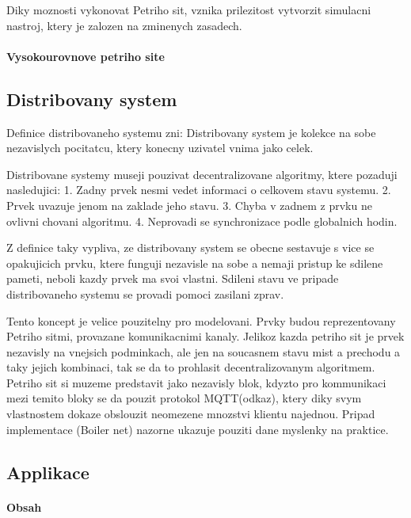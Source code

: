 Diky moznosti vykonovat Petriho sit, vznika prilezitost vytvorzit simulacni nastroj, ktery je zalozen na zminenych zasadech. 

\paragraph*{Vysokourovnove petriho site}
\subsection*{Distribovany system}
Definice distribovaneho systemu zni:
Distribovany system je kolekce na sobe nezavislych pocitatcu, ktery konecny uzivatel vnima jako celek. 

Distribovane systemy museji pouzivat decentralizovane algoritmy, ktere pozaduji nasledujici: 1. Zadny prvek nesmi vedet informaci o celkovem stavu systemu. 2. Prvek uvazuje jenom na zaklade jeho stavu. 3. Chyba v zadnem z prvku ne ovlivni chovani algoritmu. 4. Neprovadi se synchronizace podle globalnich hodin. 

Z definice taky vypliva, ze distribovany system se obecne sestavuje s vice se opakujicich prvku, ktere funguji nezavisle na sobe a nemaji pristup ke sdilene pameti, neboli kazdy prvek ma svoi vlastni. Sdileni stavu ve pripade distribovaneho systemu se provadi pomoci zasilani zprav.

Tento koncept je velice pouzitelny pro modelovani. Prvky budou reprezentovany Petriho sitmi, provazane komunikacnimi kanaly. Jelikoz kazda petriho sit je prvek nezavisly na vnejsich podminkach, ale jen na soucasnem stavu mist a prechodu a taky jejich kombinaci, tak se da to prohlasit decentralizovanym algoritmem. Petriho sit si muzeme predstavit jako nezavisly blok, kdyzto pro kommunikaci mezi temito bloky se da pouzit protokol MQTT(odkaz), ktery diky svym vlastnostem dokaze obslouzit neomezene mnozstvi klientu najednou. Pripad implementace (Boiler net) nazorne ukazuje pouziti dane myslenky na praktice.
\subsection*{Applikace}
\paragraph*{Obsah}

